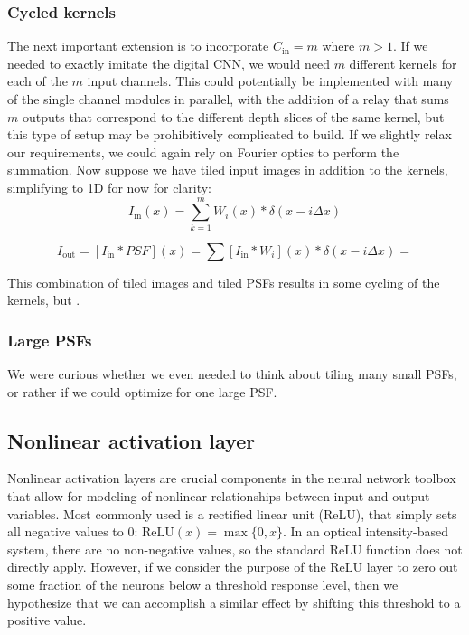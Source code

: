 \subsubsection{Cycled kernels}
The next important extension is to incorporate $C_\text{in} = m$ where $m > 1$. If we needed to exactly imitate the digital CNN, we would need $m$ different kernels for each of the $m$ input channels. This could potentially be implemented with many of the single channel modules in parallel, with the addition of a relay that sums $m$ outputs that correspond to the different depth slices of the same kernel, but this type of setup may be prohibitively complicated to build. If we slightly relax our requirements, we could again rely on Fourier optics to perform the summation. Now suppose we have tiled input images in addition to the kernels, simplifying to 1D for now for clarity:
\begin{equation} I_\text{in}(x) = \sum_{k = 1}^m W_i(x)  * \delta(x - i\Delta x)\end{equation}

\begin{equation} I_\text{out} = [I_\text{in} * PSF](x)= \sum [I_\text{in} * W_i](x) * \delta(x - i\Delta x)  =  \end{equation}

This combination of tiled images and tiled PSFs results in some cycling of the kernels, but . 

\subsubsection{Large PSFs} We were curious whether we even needed to think about tiling many small PSFs, or rather if we could optimize for one large PSF.  

\subsection{Nonlinear activation layer}
Nonlinear activation layers are crucial components in the neural network toolbox that allow for modeling of nonlinear relationships between input and output variables. Most commonly used is a rectified linear unit (ReLU), that simply sets all negative values to 0: $\text{ReLU}(x) = \max\{0, x\}$. In an optical intensity-based system, there are no non-negative values, so the standard ReLU function does not directly apply. However, if we consider the purpose of the ReLU layer to zero out some fraction of the neurons below a threshold response level, then we hypothesize that we can accomplish a similar effect by shifting this threshold to a positive value. 


